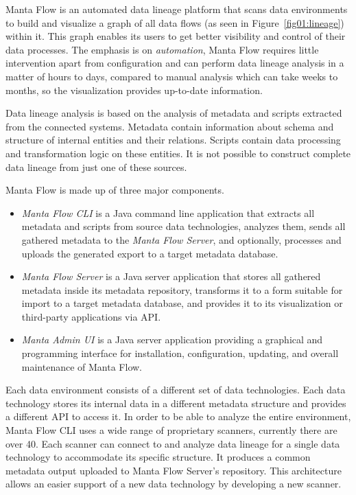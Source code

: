 Manta Flow is an automated data lineage platform that scans data environments to build and visualize a graph of all data flows (as seen in Figure~\ref{fig01:lineage}) within it. This graph enables its users to get better visibility and control of their data processes. The emphasis is on \textit{automation}, Manta Flow requires little intervention apart from configuration and can perform data lineage analysis in a matter of hours to days, compared to manual analysis which can take weeks to months, so the visualization provides up-to-date information.
\par
Data lineage analysis is based on the analysis of metadata and scripts extracted from the connected systems. Metadata contain information about schema and structure of internal entities and their relations. Scripts contain data processing and transformation logic on these entities. It is not possible to construct complete data lineage from just one of these sources.
\par
Manta Flow is made up of three major components.
\begin{itemize}
    \item \textit{Manta Flow CLI} is a Java command line application that extracts all metadata and scripts from source data technologies, analyzes them, sends all gathered metadata to the \textit{Manta Flow Server}, and optionally, processes and uploads the generated export to a target metadata database.
    \item \textit{Manta Flow Server} is a Java server application that stores all gathered metadata inside its metadata repository, transforms it to a form suitable for import to a target metadata database, and provides it to its visualization or third-party applications via API.
    \item \textit{Manta Admin UI} is a Java server application providing a graphical and programming interface for installation, configuration, updating, and overall maintenance of Manta Flow.
\end{itemize}
\par
Each data environment consists of a different set of data technologies. Each data technology stores its internal data in a different metadata structure and provides a different API to access it. In order to be able to analyze the entire environment, Manta Flow CLI uses a wide range of proprietary scanners, currently there are over 40. Each scanner can connect to and analyze data lineage for a single data technology to accommodate its specific structure. It produces a common metadata output uploaded to Manta Flow Server's repository. This architecture allows an easier support of a new data technology by developing a new scanner.

